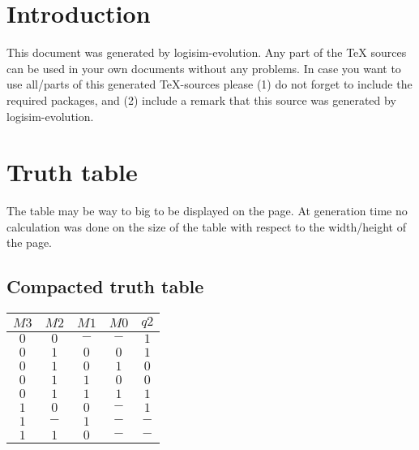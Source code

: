\documentclass [15pt,a4paper,twoside]{article}
\begin{document}
\section{Introduction}
This document was generated by logisim-evolution. Any part of the TeX sources can be used in your own documents without any problems. In case you want to use all/parts of this generated TeX-sources please (1) do not forget to include the required packages, and (2) include a remark that this source was generated by logisim-evolution.
\section{Truth table}
The table may be way to big to be displayed on the page. At generation time no calculation was done on the size of the table with respect to the width/height of the page.
\subsection{Compacted truth table}
\begin{center}
\begin{tabular}{cccc|c}
$M3$&$M2$&$M1$&$M0$&$q2$\\
\hline
$0$&$0$&$-$&$-$&$1$\\
$0$&$1$&$0$&$0$&$1$\\
$0$&$1$&$0$&$1$&$0$\\
$0$&$1$&$1$&$0$&$0$\\
$0$&$1$&$1$&$1$&$1$\\
$1$&$0$&$0$&$-$&$1$\\
$1$&$-$&$1$&$-$&$-$\\
$1$&$1$&$0$&$-$&$-$\\

\end{tabular}
\end{center}
\end{document}

